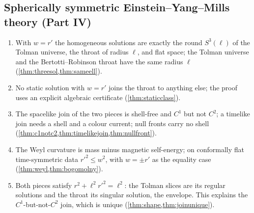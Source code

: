 \subsection*{Spherically symmetric Einstein--Yang--Mills theory (Part IV)}
\begin{enumerate}[label=R\arabic*.,leftmargin=*,resume]
\item With $w=r'$ the homogeneous solutions are exactly the round $S^3(\ell)$ of the Tolman universe, the throat of radius $\ell$, and flat space; the Tolman universe and the Bertotti--Robinson throat have the same radius $\ell$ (\cref{thm:threesol,thm:sameell}).
\item No static solution with $w=r'$ joins the throat to anything else; the proof uses an explicit algebraic certificate (\cref{thm:staticclass}).
\item The spacelike join of the two pieces is shell-free and $C^1$ but not $C^2$; a timelike join needs a shell and a colour current; null fronts carry no shell (\cref{thm:c1notc2,thm:timelikejoin,thm:nullfront}).
\item The Weyl curvature is mass minus magnetic self-energy; on conformally flat time-symmetric data $r'^2\le w^2$, with $w=\pm r'$ as the equality case (\cref{thm:weyl,thm:bogomolny}).
\item Both pieces satisfy $r^2+\ell^2r'^2=\ell^2$: the Tolman slices are its regular solutions and the throat its singular solution, the envelope. This explains the $C^1$-but-not-$C^2$ join, which is unique (\cref{thm:shape,thm:joinunique}).
\end{enumerate}

